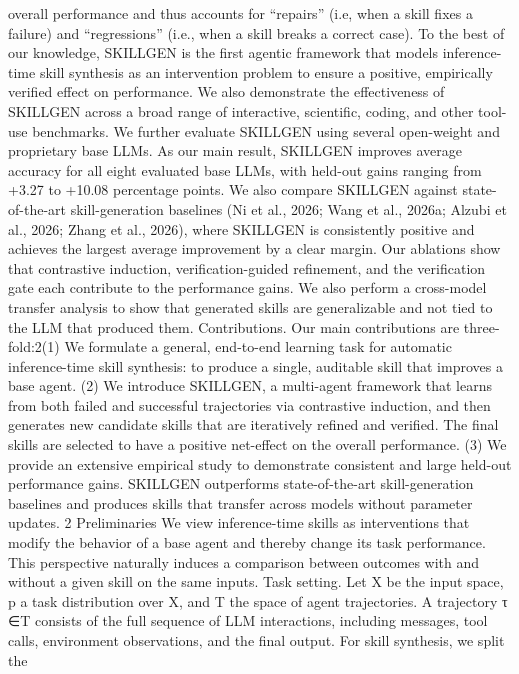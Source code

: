 overall performance and thus accounts for “repairs” (i.e, when a skill fixes a failure) and “regressions”
(i.e., when a skill breaks a correct case). To the best of our knowledge, SKILLGEN is the first agentic
framework that models inference-time skill synthesis as an intervention problem to ensure a positive,
empirically verified effect on performance.
We also demonstrate the effectiveness of SKILLGEN across a broad range of interactive, scientific,
coding, and other tool-use benchmarks. We further evaluate SKILLGEN using several open-weight
and proprietary base LLMs. As our main result, SKILLGEN improves average accuracy for all eight
evaluated base LLMs, with held-out gains ranging from +3.27 to +10.08 percentage points. We
also compare SKILLGEN against state-of-the-art skill-generation baselines (Ni et al., 2026; Wang
et al., 2026a; Alzubi et al., 2026; Zhang et al., 2026), where SKILLGEN is consistently positive and
achieves the largest average improvement by a clear margin. Our ablations show that contrastive
induction, verification-guided refinement, and the verification gate each contribute to the performance
gains. We also perform a cross-model transfer analysis to show that generated skills are generalizable
and not tied to the LLM that produced them.
Contributions. Our main contributions are three-fold:2(1) We formulate a general, end-to-end
learning task for automatic inference-time skill synthesis: to produce a single, auditable skill that
improves a base agent. (2) We introduce SKILLGEN, a multi-agent framework that learns from both
failed and successful trajectories via contrastive induction, and then generates new candidate skills
that are iteratively refined and verified. The final skills are selected to have a positive net-effect on
the overall performance. (3) We provide an extensive empirical study to demonstrate consistent and
large held-out performance gains. SKILLGEN outperforms state-of-the-art skill-generation baselines
and produces skills that transfer across models without parameter updates.
2
Preliminaries
We view inference-time skills as interventions that modify the behavior of a base agent and thereby
change its task performance. This perspective naturally induces a comparison between outcomes
with and without a given skill on the same inputs.
Task setting. Let X be the input space, p a task distribution over X, and T the space of agent
trajectories. A trajectory τ ∈T consists of the full sequence of LLM interactions, including
messages, tool calls, environment observations, and the final output. For skill synthesis, we split the
